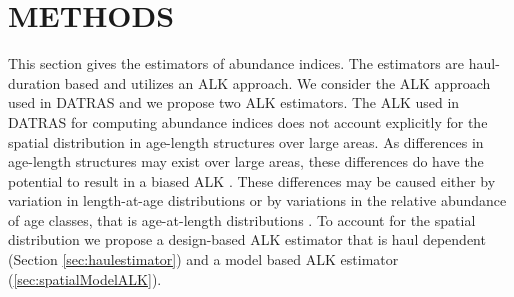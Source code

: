 \documentclass[a4paper 12pt]{article}
\numberwithin{equation}{section}
\begin{document}
\section{\large METHODS}
\label{sec:methods}
This section gives the estimators of abundance indices. The estimators are haul-duration based and utilizes an ALK approach. We consider the ALK approach used in DATRAS and we propose two ALK estimators. The ALK used in DATRAS for computing abundance indices does not account explicitly for the spatial distribution in age-length structures over large areas. As differences in age-length structures may exist over large areas, these differences do have the potential to result in a biased ALK \citep{gerritsen2006simple,kimura1977statistical}. These differences may be caused either by variation in length-at-age distributions or by variations in the relative abundance of age classes, that is age-at-length distributions \citep{gerritsen2006simple}.  To account for the spatial distribution we propose a design-based ALK estimator that is haul dependent (Section \ref{sec:haulestimator}) and a model based ALK estimator (\ref{sec:spatialModelALK}).
\end{document}
